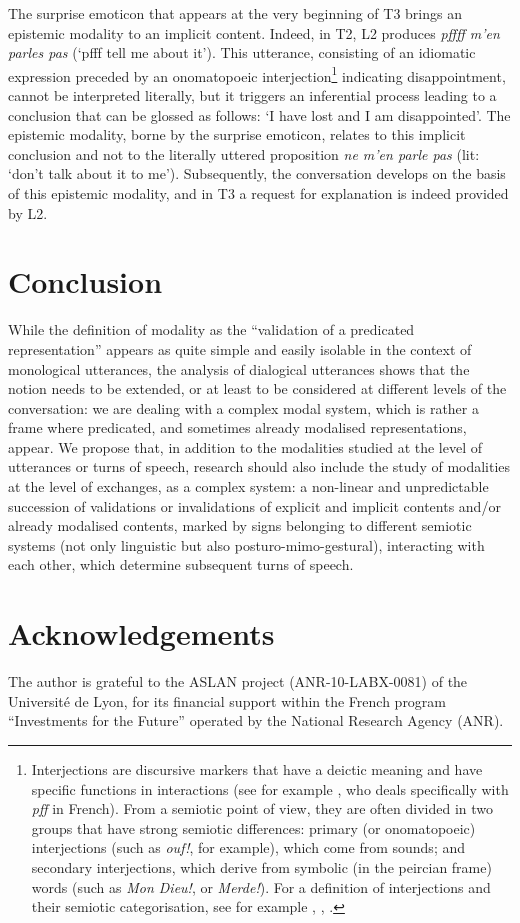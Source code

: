 \documentclass[output=paper]{langscibook}
\begin{document}
The surprise emoticon that appears at the very beginning of T3 brings an epistemic modality to an implicit content. Indeed, in T2, L2 produces \textit{p{f}{f}{f}{f} m'en parles pas} (`p{f}{f}{f} tell me about it'). This utterance, consisting of an idiomatic expression preceded by an onomatopoeic interjection\footnote{Interjections are discursive markers that have a deictic meaning and have specific functions in interactions (see for example \citet{Baldauf-Quilliatre2016}, who deals specifically with \textit{pff} in French). From a semiotic point of view, they are often divided in two groups that have strong semiotic differences: primary (or onomatopoeic) interjections (such as \textit{ouf!}, for example), which come from sounds; and secondary interjections, which derive from symbolic (in the peircian frame) words (such as \textit{Mon Dieu!}, or \textit{Merde!}). For a definition of interjections and their semiotic categorisation, see for example \citealt{Swiatkowska2006}, \citealt{Kleiber2006}, \citealt{Halté2018}.} indicating disappointment, cannot be interpreted literally, but it triggers an inferential process leading to a conclusion that can be glossed as follows: `I have lost and I am disappointed'. The epistemic modality, borne by the surprise emoticon, relates to this implicit conclusion and not to the literally uttered proposition \textit{ne m’en parle pas} (lit: `don’t talk about it to me'). Subsequently, the conversation develops on the basis of this epistemic modality, and in T3 a request for explanation is indeed provided by L2.

\section{Conclusion}

While the definition of modality as the “validation of a predicated representation” appears as quite simple and easily isolable in the context of monological utterances, the analysis of dialogical utterances shows that the notion needs to be extended, or at least to be considered at different levels of the conversation: we are dealing with a complex modal system, which is rather a frame where predicated, and sometimes already modalised representations, appear. We propose that, in addition to the modalities studied at the level of utterances or turns of speech, research should also include the study of modalities at the level of exchanges, as a complex system: a non-linear and unpredictable succession of validations or invalidations of explicit and implicit contents and/or already modalised contents, marked by signs belonging to different semiotic systems (not only linguistic but also posturo-mimo-gestural), interacting with each other, which determine subsequent turns of speech. 


\section*{Acknowledgements}
The author is grateful to the ASLAN project (ANR-10-LABX-0081) of the Université de Lyon, for its financial support within the French program “Investments for the Future” operated by the National Research Agency (ANR).

{\sloppy\printbibliography[heading=subbibliography,notkeyword=this]}
\end{document}

